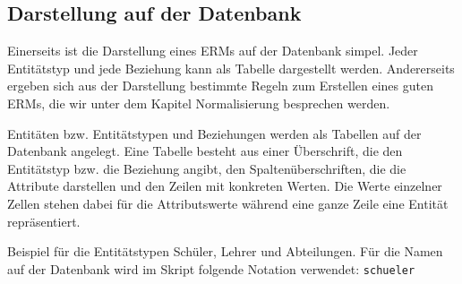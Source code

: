 \subsection[Darstellung auf der DB]{Darstellung auf der Datenbank}
Einerseits ist die Darstellung eines ERMs auf der Datenbank simpel. Jeder Entitätstyp und jede Beziehung kann als Tabelle dargestellt werden. Andererseits ergeben sich aus der Darstellung bestimmte Regeln zum Erstellen eines guten ERMs, die wir unter dem Kapitel Normalisierung besprechen werden.

\begin{tcolorbox}[title=Entitäten/-stypen und Beziehungen auf der Datenbank]
	Entitäten bzw. Entitätstypen und Beziehungen werden als Tabellen auf der Datenbank angelegt. Eine Tabelle besteht aus einer Überschrift, die den Entitätstyp bzw. die Beziehung angibt, den Spaltenüberschriften, die die Attribute darstellen und den Zeilen mit konkreten Werten. Die Werte einzelner Zellen stehen dabei für die Attributswerte während eine ganze Zeile eine Entität repräsentiert.
\end{tcolorbox}
Beispiel für die Entitätstypen Schüler, Lehrer und Abteilungen. Für die Namen auf der Datenbank wird im Skript folgende Notation verwendet: \lstinline!schueler!

\bigskip

